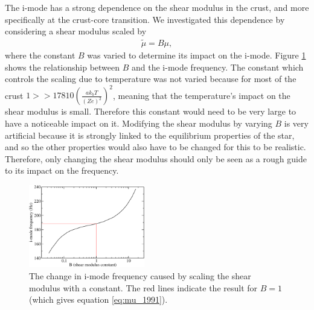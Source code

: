\documentclass[fleqn,usenatbib]{mnras}
\begin{document}
\hspace{\parindent}The i-mode has a strong dependence on the shear modulus in the crust, and more specifically at the crust-core transition. We investigated this dependence by considering a shear modulus scaled by 
\begin{align}
\tilde{\mu} = B \mu,
\end{align}
\noindent where the constant $B$ was varied to determine its impact on the i-mode. Figure \ref{fig:mu_B} shows the relationship between $B$ and the i-mode frequency. The constant which controls the scaling due to temperature was not varied because for most of the crust $1>>17810\left(\frac{ak_bT}{\left(Ze\right)^2}\right)^2$, meaning that the temperature's impact on the shear modulus is small. Therefore this constant would need to be very large to have a noticeable impact on it. Modifying the shear modulus by varying $B$ is very artificial because it is strongly linked to the equilibrium properties of the star, and so the other properties would also have to be changed for this to be realistic. Therefore, only changing the shear modulus should only be seen as a rough guide to its impact on the frequency.

\begin{figure}
\centering
\includegraphics[width=0.45\textwidth,angle=0]{shear_mod_vs_freq_2}
\caption{The change in i-mode frequency caused by scaling the shear modulus with a constant. The red lines indicate the result for $B=1$ (which gives equation \ref{eq:mu_1991}).}
\label{fig:mu_B}
\end{figure}
\end{document}
